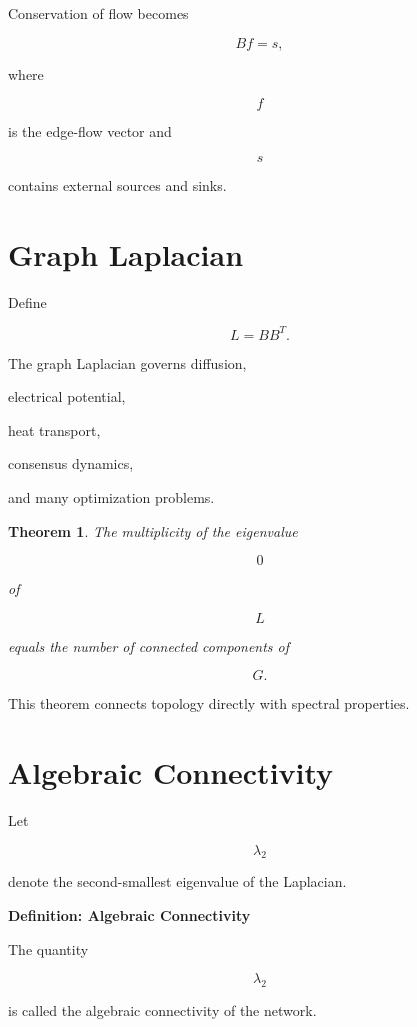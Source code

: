 \documentclass[11pt,fleqn]{book}
\numberwithin{equation}{chapter}
\newenvironment{definition}[1]
  {\begin{definitionEnv}
   \noindent\textbf{Definition: #1}\par\smallskip}
  {\end{definitionEnv}}
\theoremstyle{plain}
\newtheorem{theorem}{Theorem}[chapter]
\theoremstyle{definition}
\theoremstyle{remark}
\begin{document}
Conservation of flow becomes

\[
Bf=s,
\]

where

\[
f
\]

is the edge-flow vector and

\[
s
\]

contains external sources and sinks.


\section{Graph Laplacian}

Define

\[
L
=
BB^T.
\]

The graph Laplacian governs diffusion,

electrical potential,

heat transport,

consensus dynamics,

and many optimization problems.


\begin{theorem}

The multiplicity of the eigenvalue

\[
0
\]

of

\[
L
\]

equals the number of connected components of

\[
G.
\]

\end{theorem}

This theorem connects topology directly with spectral properties.


\section{Algebraic Connectivity}

Let

\[
\lambda_2
\]

denote the second-smallest eigenvalue of the Laplacian.


\begin{definition}{Algebraic Connectivity}

The quantity

\[
\lambda_2
\]

is called the algebraic connectivity of the network.

\end{definition}
\end{document}
